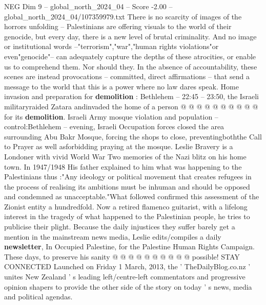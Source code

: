 \begin{textsample}{NEG Dim 9 – global\_north\_2024\_04 – Score -2.00 – global\_north\_2024\_04/107359979.txt}
There is no scarcity of images of the horrors unfolding -- Palestinians are offering visuals to the world of their genocide, but every day, there is a new level of brutal criminality.
And no image or institutional words --"terrorism","war","human rights violations"or even"genocide"-- can adequately capture the depths of these atrocities, or enable us to comprehend them.
Nor should they.
In the absence of accountability, these scenes are instead provocations -- committed, direct affirmations -- that send a message to the world that this is a power where no law dares speak.
Home invasion and preparation for \textbf{demolition} : Bethlehem -- 22:45 -- 23:50, the Israeli militaryraided Zatara andinvaded the home of a person @ @ @ @ @ @ @ @ @ @ for its \textbf{demolition}.
Israeli Army mosque violation and population -- control:Bethlehem -- evening, Israeli Occupation forces closed the area surrounding Abu Bakr Mosque, forcing the shops to close, preventingboththe Call to Prayer as well asforbidding praying at the mosque.
Leslie Bravery is a Londoner with vivid World War Two memories of the Nazi blitz on his home town.
In 1947/1948 His father explained to him what was happening to the Palestinians thus :"Any ideology or political movement that creates refugees in the process of realising its ambitions must be inhuman and should be opposed and condemned as unacceptable."What followed confirmed this assessment of the Zionist entity a hundredfold.
Now a retired flamenco guitarist, with a lifelong interest in the tragedy of what happened to the Palestinian people, he tries to publicise their plight.
Because the daily injustices they suffer barely get a mention in the mainstream news media, Leslie edits/compiles a daily \textbf{newsletter}, In Occupied Palestine, for the Palestine Human Rights Campaign.
These days, to preserve his sanity @ @ @ @ @ @ @ @ @ @ possible!
STAY CONNECTED Launched on Friday 1 March, 2013, the ' TheDailyBlog.co.nz ' unites New Zealand ' s leading left/centre-left commentators and progressive opinion shapers to provide the other side of the story on today ' s news, media and political agendas.

\end{textsample}

